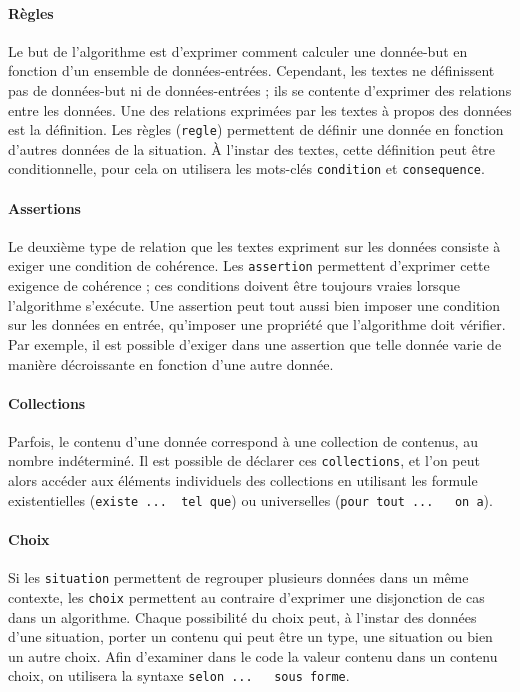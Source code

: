 \documentclass[11pt, french]{article}
\begin{document}
\paragraph{Règles} Le but de l'algorithme est d'exprimer comment calculer une donnée-but en fonction d'un ensemble de données-entrées. Cependant, les textes ne définissent pas de données-but ni de données-entrées ; ils se contente d'exprimer des relations entre les données. Une des relations exprimées par les textes à propos des données est la définition. Les règles (\lstinline|regle|) permettent de définir une donnée en fonction d'autres données de la situation. À l'instar des textes, cette définition peut être conditionnelle, pour cela on utilisera les mots-clés \lstinline|condition| et \lstinline|consequence|.

\paragraph{Assertions} Le deuxième type de relation que les textes expriment sur les données consiste à exiger une condition de cohérence. Les \lstinline|assertion| permettent d'exprimer cette exigence de cohérence ; ces conditions doivent être toujours vraies lorsque l'algorithme s'exécute. Une assertion peut tout aussi bien imposer une condition sur les données en entrée, qu'imposer une propriété que l'algorithme doit vérifier. Par exemple, il est possible d'exiger dans une assertion que telle donnée varie de manière décroissante en fonction d'une autre donnée.

\paragraph{Collections} Parfois, le contenu d'une donnée correspond à une collection de contenus, au nombre indéterminé. Il est possible de déclarer ces \lstinline|collections|, et l'on peut alors accéder aux éléments individuels des collections en utilisant les formule existentielles (\lstinline|existe ...  tel que|) ou universelles (\lstinline|pour tout ...   on a|).

\paragraph{Choix} Si les \lstinline|situation| permettent de regrouper plusieurs données dans un même contexte, les \lstinline|choix| permettent au contraire d'exprimer une disjonction de cas dans un algorithme. Chaque possibilité du choix peut, à l'instar des données d'une situation, porter un contenu qui peut être un type, une situation ou bien un autre choix. Afin d'examiner dans le code la valeur contenu dans un contenu choix, on utilisera la syntaxe \lstinline|selon ...   sous forme|.
\end{document}
